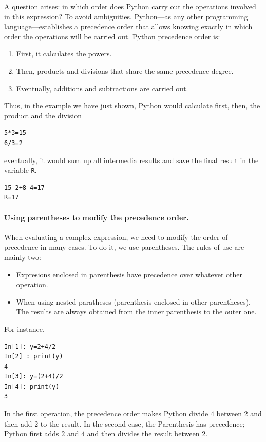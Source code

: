\begin{paracol}{2}
A question arises: in which order does Python carry out the operations involved in this expression? To avoid ambiguities, Python—as any other programming language—establishes a precedence order that allows knowing exactly in which order the operations will be carried out. Python precedence order is:
\begin{enumerate}
\item First, it calculates the powers.
\item Then, products and divisions that share the same precedence degree.
\item Eventually, additions and subtractions are carried out. 
\end{enumerate} 

Thus, in the example we have just shown, Python would calculate first,
then, the product and the division
\begin{verbatim}
5*3=15
6/3=2
\end{verbatim}
eventually, it would sum up all intermedia results and save the final result in the variable \texttt{R}.
\begin{verbatim}
15-2+8-4=17
R=17
\end{verbatim}

\paragraph{Using parentheses to modify the precedence order.}
When evaluating a complex expression, we need to modify the order of precedence in many cases. To do it, we use parentheses. The rules of use are mainly two:
\begin{itemize}
\item Expresions enclosed in parenthesis have precedence over whatever other operation.
\item When using nested paratheses (parenthesis enclosed in other parentheses). The results are always obtained from the inner parenthesis to the outer one. 
\end{itemize}

For instance,
\begin{verbatim}
In[1]: y=2+4/2
In[2] : print(y) 
4
In[3]: y=(2+4)/2
In[4]: print(y)
3
\end{verbatim}

In the first operation, the precedence order makes Python divide $4$ between $2$ and then add $2$ to the result. In the second case, the Parenthesis has precedence; Python first adds $2$ and $4$ and then divides the result between $2$.


\end{paracol}
